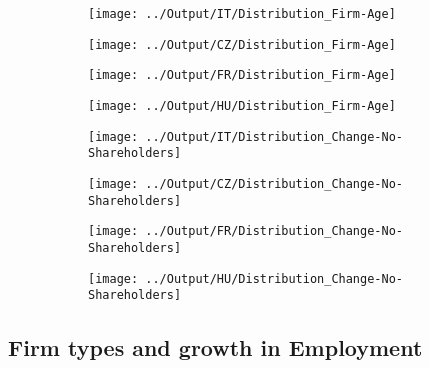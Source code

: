 \documentclass[12pt,notitlepage]{article}
\begin{document}
\begin{figure}[!htpb]
\centering
\caption{Distribution of firms across age}
\begin{subfigure}{.49\textwidth}
    \centering
 \texttt{[image: ../Output/IT/Distribution\_Firm-Age]}
\end{subfigure}%
\begin{subfigure}{.49\textwidth}
    \centering
 \texttt{[image: ../Output/CZ/Distribution\_Firm-Age]}
\end{subfigure}
\begin{subfigure}{.49\textwidth}
    \centering
 \texttt{[image: ../Output/FR/Distribution\_Firm-Age]}
\end{subfigure}%
\begin{subfigure}{.49\textwidth}
    \centering
 \texttt{[image: ../Output/HU/Distribution\_Firm-Age]}
\end{subfigure}
\end{figure}
\pagebreak

\begin{figure}[!htpb]
\centering
\caption{Distribution of firms conditional on change in shareholders}
\begin{subfigure}{.49\textwidth}
    \centering
 \texttt{[image: ../Output/IT/Distribution\_Change-No-Shareholders]}
\end{subfigure}%
\begin{subfigure}{.49\textwidth}
    \centering
 \texttt{[image: ../Output/CZ/Distribution\_Change-No-Shareholders]}
\end{subfigure}
\begin{subfigure}{.49\textwidth}
    \centering
 \texttt{[image: ../Output/FR/Distribution\_Change-No-Shareholders]}
\end{subfigure}%
\begin{subfigure}{.49\textwidth}
    \centering
 \texttt{[image: ../Output/HU/Distribution\_Change-No-Shareholders]}
\end{subfigure}
\end{figure}
\pagebreak

\subsection*{Firm types and growth in Employment}
\end{document}

